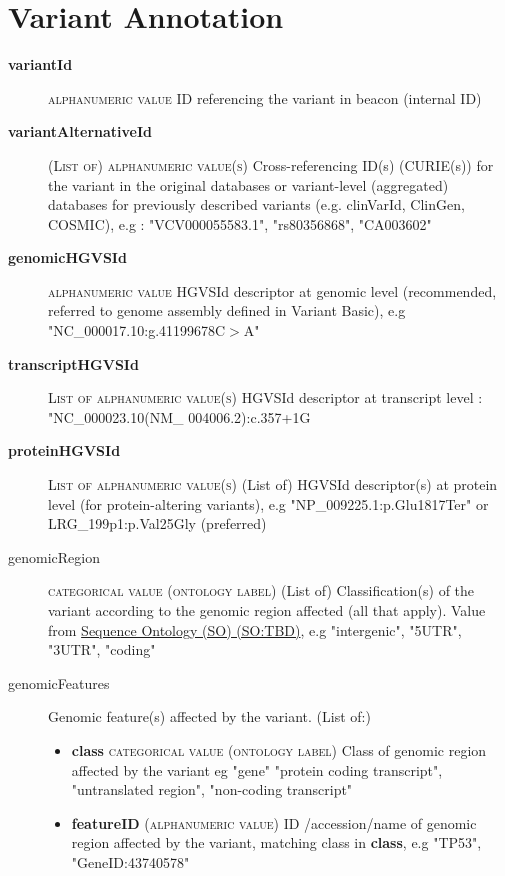 \documentclass[a4paper, 10pt]{article}        %
\begin{document}
 
  \section*{ {\color{teal} Variant Annotation}}
  
  \begin{description}
	\item[\textbf{variantId}] {\textsc{alphanumeric value}} ID referencing the variant in beacon (internal ID)
	\item[\textbf{variantAlternativeId}] {\textsc{(List of) alphanumeric value(s)}} Cross-referencing ID(s) (CURIE(s)) for the variant in the original databases or variant-level (aggregated) databases for previously described variants (e.g. clinVarId, ClinGen, COSMIC), e.g : "VCV000055583.1", "rs80356868", "CA003602"
	\item[\textbf{genomicHGVSId}]  {\textsc{alphanumeric value}} HGVSId descriptor at genomic level (recommended, referred to genome assembly defined in Variant Basic), e.g "NC\_000017.10:g.41199678C$>$A"
	\item[\textbf{transcriptHGVSId}] {\textsc{List of alphanumeric value(s)}} HGVSId descriptor at transcript level : "NC\_000023.10(NM\_ 004006.2):c.357+1G%
	\item[\textbf{proteinHGVSId}] {\textsc{List of alphanumeric value(s)}} (List of) HGVSId descriptor(s) at protein level (for protein-altering variants), e.g "NP\_009225.1:p.Glu1817Ter" or LRG\_199p1:p.Val25Gly (preferred)
	\item[genomicRegion] {\textsc{categorical value (ontology label)}} (List of) Classification(s) of the variant according to the genomic region affected (all that apply). Value from \href{link}{Sequence Ontology (SO) (SO:TBD)}, e.g "intergenic", "5UTR", "3UTR", "coding" %
	\item[genomicFeatures] Genomic feature(s) affected by the variant. (List of:)
	\begin{itemize}
			\item[]  \textbf{class} {\textsc{categorical value (ontology label)}} Class of genomic region affected by the variant eg "gene" "protein coding transcript", "untranslated region", "non-coding transcript"
			\item[]  \textbf{featureID} {\textsc{(alphanumeric value)}} ID /accession/name of genomic region affected by the variant, matching class in \textbf{class}, e.g "TP53", "GeneID:43740578"

\end{itemize}
\end{description}
\end{document}
